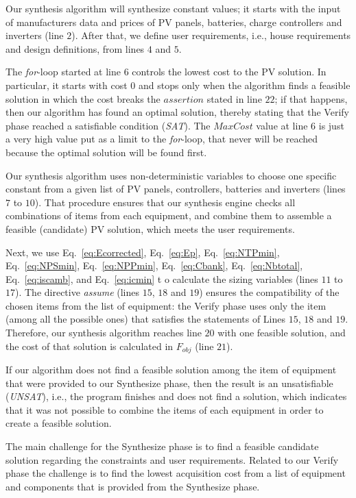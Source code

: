 \documentclass[journal]{IEEEtran}
\begin{document}
%

Our synthesis algorithm will synthesize constant values; 
it starts with the input of manufacturers data and prices of PV panels, batteries, 
charge controllers and inverters (line $2$). After that, we define user requirements, i.e., 
house requirements and design definitions, from lines $4$ and $5$. 

The \textit{for}-loop started at line $6$ controls the lowest cost to the PV solution. 
In particular, it starts with cost $0$ and stops only when the algorithm finds a 
feasible solution in which the cost breaks the $assertion$ stated in line $22$; 
if that happens, then our algorithm has found an optimal solution, thereby stating 
that the {\sc Verify} phase reached a satisfiable condition (\textit{SAT}). 
The $MaxCost$ value at line $6$ is just a very high value put as a limit 
to the \textit{for}-loop, that never will be reached because the optimal solution will be found first.

Our synthesis algorithm uses non-deterministic variables to choose one specific constant 
from a given list of PV panels, controllers, batteries and inverters (lines $7$ to $10$). 
That procedure ensures that our synthesis engine checks all combinations of items 
from each equipment, and combine them to assemble a feasible (candidate) PV solution, 
which meets the user requirements.

Next, we use Eq.~\eqref{eq:Ecorrected}, Eq.~\eqref{eq:Ep}, Eq.~\eqref{eq:NTPmin}, 
Eq.~\eqref{eq:NPSmin}, Eq.~\eqref{eq:NPPmin}, Eq.~\eqref{eq:Cbank}, 
Eq.~\eqref{eq:Nbtotal}, Eq.~\eqref{eq:iscamb}, and Eq.~\eqref{eq:icmin} t
o calculate the sizing variables (lines $11$ to $17$). The directive \textit{assume} (lines $15$, $18$ and $19$) 
ensures the compatibility of the chosen items from the list of equipment: the {\sc Verify} phase 
uses only the item (among all the possible ones) that satisfies the statements of Lines $15$, $18$ and $19$. 
Therefore, our synthesis algorithm reaches line $20$ with one feasible solution, 
and the cost of that solution is calculated in $F_{obj}$ (line $21$). 

If our algorithm does not find a feasible solution among the item of equipment that 
were provided to our {\sc Synthesize} phase,  then the result is an unsatisfiable (\textit{UNSAT}), i.e., 
the program finishes and does not find a solution, which indicates that it 
was not possible to combine the items of each equipment in order to create a feasible solution. 

The main challenge for the {\sc Synthesize} phase is to find a feasible candidate 
solution regarding the constraints and user requirements. Related to our {\sc Verify} 
phase the challenge is to find the lowest acquisition cost from a list of equipment and 
components that is provided from the {\sc Synthesize} phase. 
\end{document}

